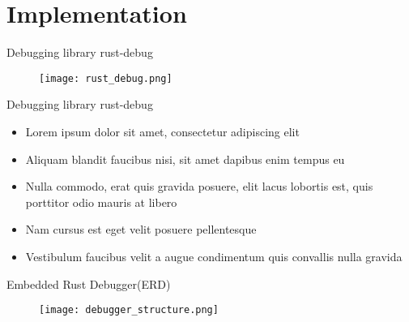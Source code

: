 \section{Implementation}

\begin{frame}{Debugging library rust-debug}
	\begin{figure}
		\texttt{[image: rust\_debug.png]}
	\end{figure}
\end{frame}


\begin{frame}{Debugging library rust-debug}
    \begin{itemize}
        \item Lorem ipsum dolor sit amet, consectetur adipiscing elit
        \item Aliquam blandit faucibus nisi, sit amet dapibus enim tempus eu
        \item Nulla commodo, erat quis gravida posuere, elit lacus lobortis est, quis porttitor odio mauris at libero
        \item Nam cursus est eget velit posuere pellentesque
        \item Vestibulum faucibus velit a augue condimentum quis convallis nulla gravida
    \end{itemize}
\end{frame}


\begin{frame}{Embedded Rust Debugger(ERD)}
	\begin{figure}
		\texttt{[image: debugger\_structure.png]}
	\end{figure}
\end{frame}


